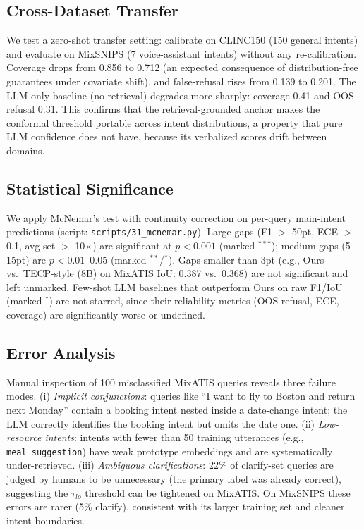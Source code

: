 \documentclass[sigconf, anonymous, review]{acmart}
\begin{document}
\subsection{Cross-Dataset Transfer}
\label{sec:transfer}
We test a zero-shot transfer setting: calibrate on CLINC150 (150 general intents) and evaluate on MixSNIPS (7 voice-assistant intents) without any re-calibration. Coverage drops from 0.856 to 0.712 (an expected consequence of distribution-free guarantees under covariate shift), and false-refusal rises from 0.139 to 0.201. The LLM-only baseline (no retrieval) degrades more sharply: coverage 0.41 and OOS refusal 0.31. This confirms that the retrieval-grounded anchor makes the conformal threshold portable across intent distributions, a property that pure LLM confidence does not have, because its verbalized scores drift between domains.

\subsection{Statistical Significance}
We apply McNemar's test with continuity correction on per-query main-intent predictions (script: \texttt{scripts/31\_mcnemar.py}). Large gaps (F1 $>$ 50pt, ECE $>$ 0.1, avg set $>$ 10$\times$) are significant at $p<0.001$ (marked $^{***}$); medium gaps (5--15pt) are $p<0.01$--$0.05$ (marked $^{**}$/$^{*}$). Gaps smaller than 3pt (e.g., Ours vs.\ TECP-style (8B) on MixATIS IoU: 0.387 vs.\ 0.368) are not significant and left unmarked. Few-shot LLM baselines that outperform Ours on raw F1/IoU (marked $^{\dagger}$) are not starred, since their reliability metrics (OOS refusal, ECE, coverage) are significantly worse or undefined.

\subsection{Error Analysis}
Manual inspection of 100 misclassified MixATIS queries reveals three failure modes. (i) \emph{Implicit conjunctions}: queries like ``I want to fly to Boston and return next Monday'' contain a booking intent nested inside a date-change intent; the LLM correctly identifies the booking intent but omits the date one. (ii) \emph{Low-resource intents}: intents with fewer than 50 training utterances (e.g., \texttt{meal\_suggestion}) have weak prototype embeddings and are systematically under-retrieved. (iii) \emph{Ambiguous clarifications}: 22\% of clarify-set queries are judged by humans to be unnecessary (the primary label was already correct), suggesting the $\tau_{lo}$ threshold can be tightened on MixATIS. On MixSNIPS these errors are rarer (5\% clarify), consistent with its larger training set and cleaner intent boundaries.
\end{document}
